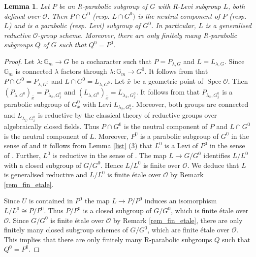 \documentclass{amsart}
\newtheorem{lem}[prop]{Lemma}
\theoremstyle{definition}
\theoremstyle{remark}
\DeclareMathOperator{\Spec}{Spec}
\newcommand{\OO}{\mathcal O}
\newcommand{\Gm}{\mathbb G_{m}}
\newcommand{\xbar}{\bar{x}}
\renewcommand{\xbar}{\bar{x}}
\begin{document}
\begin{lem}\label{para} Let $P$ be an R-parabolic subgroup of $G$ with R-Levi subgroup $L$, both defined over $\OO$. 
Then $P\cap G^0$ (resp. $L\cap G^0)$ is the neutral component of $P$ (resp. $L$) and is a parabolic  (resp. Levi) 
subgroup of $G^0$. In particular, $L$ is a generalised reductive $\OO$-group scheme. Moreover, there are only finitely 
many R-parabolic subgroups $Q$ of $G$ such that $Q^0=P^0$. 
\end{lem} 
\begin{proof} Let $\lambda: \Gm\rightarrow G$ be a cocharacter such that $P=P_{\lambda, G}$ and $L=L_{\lambda, G}$. 
Since $\Gm$ is connected $\lambda$ factors through $\lambda: \Gm\rightarrow G^0$. 
It follows from \cite[Lemma 2.1.5]{CGP} that $P\cap G^0=P_{\lambda, G^0}$ and $L\cap G^0= L_{\lambda, G^0}$. 
Let $\xbar$ be a geometric point of $\Spec \OO$. Then $(P_{\lambda, G^0})_{\xbar}= P_{\lambda_{\xbar}, G^0_{\xbar}}$
and $(L_{\lambda, G^0})_{\xbar}= L_{\lambda_{\xbar}, G^0_{\xbar}}$. It follows from \cite[Proposition 2.2.9]{CGP} 
that $P_{\lambda_{\xbar}, G^0_{\xbar}}$ is a parabolic subgroup of $G^0_{\xbar}$ with Levi $L_{\lambda_{\xbar}, G^0_{\xbar}}$.
Moreover, both groups are connected and $L_{\lambda_{\xbar}, G^0_{\xbar}}$ is reductive by the classical theory of reductive groups
over algebraically closed fields. Thus $P\cap G^0$ is the neutral component of $P$ and $L\cap G^0$ is the neutral component of 
$L$. Moreover, $P^0$ is a parabolic subgroup of $G^0$ in the sense of \cite[Definition 5.2.1]{bcnrd} and it follows from 
Lemma \ref{list} (3) that $L^0$ is a Levi of $P^0$ in the sense of \cite[Definition 5.4.2]{bcnrd}. Further, $L^0$ 
is reductive in the sense of \cite[Definition 3.1.1]{bcnrd}.
The map $L\rightarrow G/G^0$ identifies $L/L^0$ with a closed subgroup of $G/G^0$. 
Hence $L/L^0$ is finite over $\OO$. We deduce that $L$ is generalised reductive and $L/L^0$ is finite \'etale over $\OO$ by Remark \ref{rem_fin_etale}.

 Since $U$ is contained in $P^0$ the map $L\rightarrow P/P^0$ induces an isomorphism 
$L/L^0\cong P/P^0$. Thus $P/P^0$ is a  closed subgroup of $G/G^0$, which is finite \'etale
over $\OO$. 
Since  $G/G^0$ is finite \'etale over $\OO$ by Remark \ref{rem_fin_etale}, there are only finitely many closed subgroup schemes of $G/G^0$, which are finite \'etale over $\OO$. This implies that 
there are only finitely many R-parabolic subgroups $Q$ such that $Q^0=P^0$. 
\end{proof} 
\end{document}
